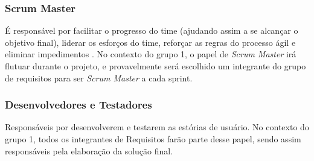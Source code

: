 \subsubsection{Scrum Master}
É responsável por facilitar o progresso do time (ajudando assim a se alcançar o objetivo final), liderar os esforços do time, reforçar as regras do processo ágil e eliminar impedimentos \cite{safe009}. No contexto do grupo 1, o papel de \emph{Scrum Master} irá flutuar durante o projeto, e provavelmente será escolhido um integrante do grupo de requisitos para ser \emph{Scrum Master} a cada sprint.

\subsubsection{Desenvolvedores e Testadores}
Responsáveis por desenvolverem e testarem as estórias de usuário. No contexto do grupo 1, todos os integrantes de Requisitos farão parte desse papel, sendo assim responsáveis pela elaboração da solução final.